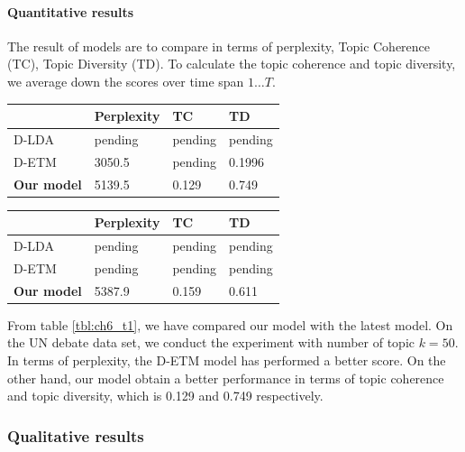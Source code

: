 \paragraph{Quantitative results}
The result of models are to compare in terms of perplexity, Topic Coherence (TC), Topic Diversity (TD). To calculate the topic coherence and topic diversity, we average down the scores over time span $ 1\dots T $.
\begin{table}[h]
\centering
\begin{tabular}{llll}
\hline
     & Perplexity  &TC&TD\\ \hline
D-LDA	     	&  pending & pending&pending\\
D-ETM	     	&  3050.5 & pending&0.1996\\
\textbf{Our model}  & 5139.5 & 0.129& 0.749\\ \hline
\end{tabular}
\end{table}
\begin{table}[h]
\centering
\begin{tabular}{llll}
\hline
     & Perplexity  &TC&TD\\ \hline
D-LDA	     	&  pending & pending&pending\\
D-ETM	     	&  pending & pending&pending\\
\textbf{Our model}  & 5387.9 & 0.159& 0.611\\ \hline
\end{tabular}
\end{table}
From table \ref{tbl:ch6_t1}, we have compared our model with the latest model. On the UN debate data set, we conduct the experiment with number of topic $ k=50 $. In terms of perplexity, the D-ETM model has performed a better score. On the other hand, our model obtain a better performance in terms of topic coherence and topic diversity, which is 0.129 and 0.749 respectively. 
\subsubsection{Qualitative results}
